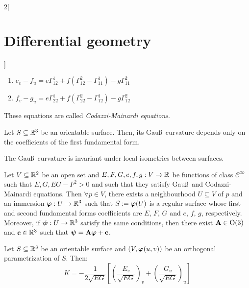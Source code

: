 \documentclass[../../../main_math.tex]{subfiles}
\begin{document}
\begin{multicols}{2}[\section{Differential geometry}]
\begin{proposition}
\begin{enumerate}
      \item $\displaystyle e_v-f_u=e\Gamma_{12}^1+f\left(\Gamma_{12}^2-\Gamma_{11}^1\right)-g\Gamma_{11}^2$
      \item $\displaystyle f_v-g_u=e\Gamma_{22}^1+f\left(\Gamma_{22}^2-\Gamma_{12}^1\right)-g\Gamma_{12}^2$
    \end{enumerate}
    These equations are called \emph{Codazzi-Mainardi equations}.
  \end{proposition}
  \begin{corollary}
    Let $S\subseteq\mathbb{R}^3$ be an orientable surface. Then, its Gau\ss\  curvature depends only on the coefficients of the first fundamental form.
  \end{corollary}
  \begin{theorem}
    The Gau\ss\  curvature is invariant under local isometries between surfaces.
  \end{theorem}
  \begin{theorem}
    Let $V\subseteq\mathbb{R}^2$ be an open set and $E,F,G,e,f,g:V\rightarrow\mathbb{R}$ be functions of class $\mathcal{C}^\infty$ such that $E,G,EG-F^2>0$ and such that they satisfy Gau\ss\  and Codazzi-Mainardi equations. Then $\forall p\in V$, there exists a neighbourhood $U\subseteq V$ of $p$ and an immersion $\boldsymbol{\mathrm{\varphi}}:U\rightarrow\mathbb{R}^3$ such that $S:=\boldsymbol{\mathrm{\varphi}}(U)$ is a regular surface whose first and second fundamental forms coefficients are $E$, $F$, $G$ and $e$, $f$, $g$, respectively. Moreover, if $\boldsymbol{\mathrm{\psi}}:U\rightarrow\mathbb{R}^3$ satisfy the same conditions, then there exist $\boldsymbol{\mathrm{A}}\in\text{O}(3)$ and $\boldsymbol{\mathrm{c}}\in\mathbb{R}^3$ such that $\boldsymbol{\mathrm{\psi}}=\boldsymbol{\mathrm{A\varphi}}+\boldsymbol{\mathrm{c}}$.
  \end{theorem}
  \begin{proposition}
    Let $S\subseteq\mathbb{R}^3$ be an orientable surface and $(V,\boldsymbol{\mathrm{\varphi}}(u,v))$ be an orthogonal parametrization of $S$. Then: $$K=-\frac{1}{2\sqrt{EG}}\left[{\left(\frac{E_v}{\sqrt{EG}}\right)}_v+{\left(\frac{G_u}{\sqrt{EG}}\right)}_u\right]$$
  \end{proposition}

\end{multicols}
\end{document}
